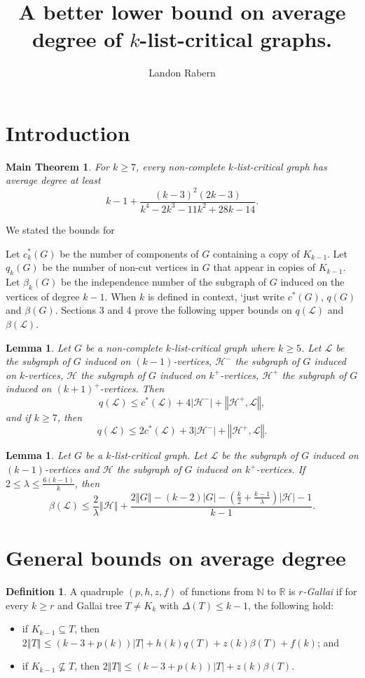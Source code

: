 \documentclass[10pt]{article}
\title{A better lower bound on average degree of $k$-list-critical graphs.}
\author{Landon Rabern}
\theoremstyle{plain}
\newtheorem*{MainTheorem}{Main Theorem}
\newtheorem{lem}[thm]{Lemma}
\theoremstyle{definition}
\newtheorem{defn}{Definition}
\theoremstyle{remark}
\newcommand{\fancy}[1]{\mathcal{#1}}
\newcommand{\IN}{\mathbb{N}}
\newcommand{\IR}{\mathbb{R}}
\renewcommand{\L}{\fancy{L}}
\newcommand{\HH}{\fancy{H}}
\newcommand{\card}[1]{\left|#1\right|}
\newcommand{\size}[1]{\left\Vert#1\right\Vert}
\newcommand{\parens}[1]{\left( #1 \right)}
\begin{document}
\maketitle

\section{Introduction}

\begin{MainTheorem}
For $k \ge 7$, every non-complete $k$-list-critical graph has average degree at least \[k-1 + \frac{(k-3)^2 (2 k-3)}{k^4-2 k^3-11 k^2+28 k-14}.\]
\end{MainTheorem}

We stated the bounds for 

Let $c_k^*(G)$ be the number of components of $G$ containing a copy of $K_{k-1}$. Let $q_k(G)$ be the number of non-cut vertices in $G$ that appear in copies of $K_{k-1}$.  
Let $\beta_k(G)$ be the independence number of the subgraph of $G$ induced on the vertices of degree $k-1$.  
When $k$ is defined in context, `just write $c^*(G)$, $q(G)$ and $\beta(G)$.  Sections 3 and 4 prove the following upper bounds on $q(\L)$ and $\beta(\L)$.
\begin{lem}\label{qLemmaList}
	Let $G$ be a non-complete $k$-list-critical graph where $k \ge 5$.  Let $\L$ be the subgraph of $G$ induced on $(k-1)$-vertices, $\HH^-$ the subgraph of $G$ induced on $k$-vertices, 
	$\HH$ the subgraph of $G$ induced on $k^+$-vertices, $\HH^+$ the subgraph of $G$ induced on $(k+1)^+$-vertices.  Then
	\[q(\L) \le c^*(\L) + 4\card{\HH^-} + \size{\HH^+, \L},\] and if $k \ge 7$, then
	\[q(\L) \le 2c^*(\L) + 3\card{\HH^-} + \size{\HH^+, \L}.\]
\end{lem}

\begin{lem}\label{betaLemmaList}
	Let $G$ be a $k$-list-critical graph.  Let $\L$ be the subgraph of $G$ induced on $(k-1)$-vertices and	$\HH$ the subgraph of $G$ induced on $k^+$-vertices.  
	If $2 \le \lambda \le \frac{6(k-1)}{k}$, then
	\[\beta(\L) \le \frac{2}{\lambda}\size{\HH} + \frac{2\size{G} - (k-2)\card{G} - \parens{\frac{k}{2} + \frac{k-1}{\lambda}}\card{\HH} - 1}{k-1}.\]
\end{lem}

\section{General bounds on average degree}
\begin{defn}
A quadruple $\parens{p,h,z,f}$ of functions from $\IN$ to $\IR$ is \emph{$r$-Gallai} if for every $k \ge r$ and Gallai tree $T \ne K_k$ with $\Delta(T) \le k-1$,
the following hold:
\begin{itemize}
\item if $K_{k-1} \subseteq T$, then $2\size{T} \le \parens{k-3 + p(k)}\card{T} + h(k)q(T) + z(k)\beta(T) + f(k)$; and
\item if $K_{k-1} \not\subseteq T$, then $2\size{T} \le \parens{k-3 + p(k)}\card{T} + z(k)\beta(T)$.
\end{itemize}
\end{defn}
\end{document}
